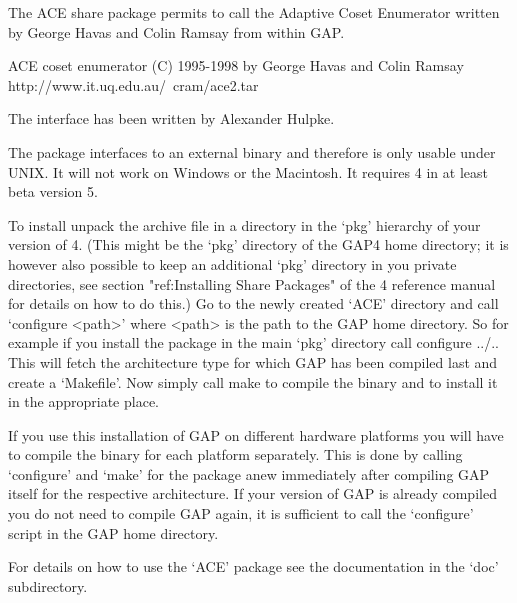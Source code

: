 

The ACE share package permits to call the Adaptive Coset Enumerator written
by George Havas and Colin Ramsay from within GAP. 

\begintt
ACE coset enumerator (C) 1995-1998 by George Havas and Colin Ramsay
    http://www.it.uq.edu.au/~cram/ace2.tar
\endtt

The {\GAP} interface has been written by Alexander Hulpke.

The package interfaces to an external binary and therefore is only usable
under UNIX. It will not work on Windows or the Macintosh. It requires
{\GAP}4 in at least beta version 5.


To install unpack the archive file in a directory in the `pkg' hierarchy of
your version of {\GAP}4. (This might be the `pkg' directory of the
GAP4 home directory; it is however also possible to keep an additional `pkg'
directory in you private directories, see section "ref:Installing Share
Packages" of the {\GAP}4 reference manual for details on how to do this.)
Go to the newly created `ACE' directory and call `configure <path>' where
<path> is the path to the GAP home directory. So for example if you install
the package in the main `pkg' directory call
\begintt
configure ../..
\endtt
This will fetch the architecture type for which GAP has been compiled last
and create a `Makefile'. 
Now simply call
\begintt
make
\endtt
to compile the binary and to install it in the appropriate place.

If you use this installation of GAP on different hardware platforms you will
have to compile the binary for each platform separately. This is done by
calling `configure' and `make' for the package anew immediately after
compiling GAP itself for the respective architecture.
If your version of GAP is already compiled you do not need to compile GAP
again, it is sufficient to call the `configure' script in the GAP home
directory.

For details on how to use the `ACE' package see the documentation in the
`doc' subdirectory.

